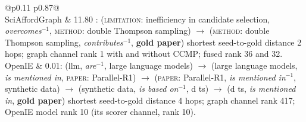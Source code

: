 \begin{table}[H]
\centering
\resulttablestyle
\setlength{\tabcolsep}{5pt}
\renewcommand{\arraystretch}{1.25}
\begin{tabular}{@{}p{0.11\linewidth} p{0.87\linewidth}@{}}
\toprule
{} \\
\midrule
SciAfford\-Graph &
11.80 :\; (\textsc{limitation}: inefficiency in candidate selection,\; \textit{overcomes}$^{-1}$,\;
\textsc{method}: double Thompson sampling) $\rightarrow$
(\textsc{method}: double Thompson sampling,\; \textit{contributes}$^{-1}$,\; \textbf{gold paper}) \newline
{\footnotesize shortest seed-to-gold distance 2 hops; graph channel rank 1 with and without CCMP; fused rank 36 and 32.} \\
OpenIE &
0.01:\; (llm,\; \textit{are}$^{-1}$,\; large language models) $\rightarrow$ (large language models,\; \textit{is mentioned in},\;
\textsc{paper}: Parallel-R1) $\rightarrow$ (\textsc{paper}: Parallel-R1,\; \textit{is mentioned in}$^{-1}$,\; synthetic data) $\rightarrow$
(synthetic data,\; \textit{is based on}$^{-1}$,\; d ts) $\rightarrow$ (d ts,\; \textit{is mentioned in},\; \textbf{gold paper}) \newline
{\footnotesize shortest seed-to-gold distance 4 hops; graph channel rank 417; OpenIE model rank 10 (its scorer channel, rank 10).} \\
\bottomrule
\end{tabular}
\caption{Path interpretations for Figure~\ref{fig:qual-cs-bandits}. Top-weighted route from the query's seed
frames to the gold under each trained reasoner (beam search over the gradient of the graph score with
respect to each layer's edge weights, as in NBFNet and GFM-RAG); $r^{-1}$ is the inverse relation; grey
weight is the same weights with the CCMP gate off. The frame graph states the reason in two typed hops; the
entity graph's route is a chain of co-mentions with no content.}
\label{tab:paths-cs-bandits}
\end{table}
